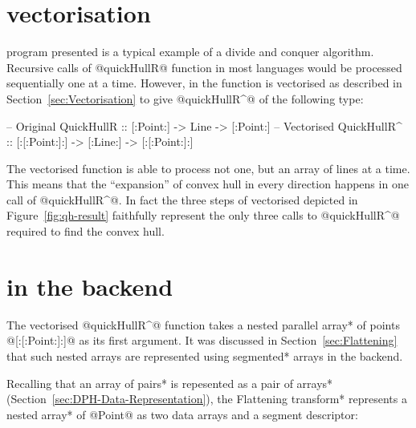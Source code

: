 \documentclass[preamble.tex]{subfiles}
\begin{document}
\section{\QuickHull vectorisation}

\QuickHull program presented is a typical example of a divide and conquer algorithm. Recursive calls of @quickHullR@ function in most languages would be processed sequentially one at a time. However, in \DPH the function is vectorised as described in Section~\ref{sec:Vectorisation} to give @quickHullR^@ of the following type:


\begin{hscode}[literate={^}{{$^\uparrow$}}1,]
-- Original
QuickHullR  :: [:Point:] -> Line -> [:Point:]
-- Vectorised
QuickHullR^ :: [:[:Point:]:] -> [:Line:] -> [:[:Point:]:]
\end{hscode}


The vectorised function is able to process not one, but an array of lines at a time. This means that the ``expansion'' of convex hull in every direction happens in one call of @quickHullR^@. In fact the three steps of vectorised \QuickHull depicted in Figure~\ref{fig:qh-result} faithfully represent the only three calls to @quickHullR^@ required to find the convex hull.



\section{\QuickHull in the backend}

The vectorised @quickHullR^@ function takes a \*nested parallel array* of points @[:[:Point:]:]@ as its first argument. It was discussed in Section~\ref{sec:Flattening} that such nested arrays are represented using \*segmented* arrays in the backend.

Recalling that an \*array of pairs* is repesented as a \*pair of arrays* (Section~\ref{sec:DPH-Data-Representation}), the \*Flattening transform* represents a \*nested array* of @Point@ as two data arrays and a segment descriptor:


\newlength\fixedcharwidth
{}
\newcommand\seg[1]{\rule{#1\fixedcharwidth}{1pt}}

\end{document}
